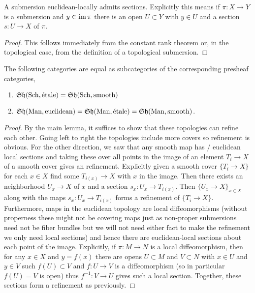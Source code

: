 \documentclass[12pt]{article}
\begin{document}
\begin{lemma}
A submersion euclidean-locally admits sections. Explicitly this means if $\pi : X \to Y$ is a submersion and $y \in \operatorname{\mathrm{im}}{\pi}$ there is an open $U \subset Y$ with $y \in U$ and a section $s : U \to X$ of $\pi$. 
\end{lemma}

\begin{proof}
This follows immediately from the constant rank theorem or, in the topological case, from the definition of a topological submersion.
\end{proof}

\begin{theorem}
The following categories are equal as subcategories of the corresponding presheaf categories,
\begin{enumerate}
\item $\mathfrak{Sh}(\mathrm{Sch}, \text{\'{e}tale}) = \mathfrak{Sh}(\mathrm{Sch}, \mathrm{smooth})$
\item $\mathfrak{Sh}(\mathrm{Man}, \text{euclidean}) = \mathfrak{Sh}(\mathrm{Man}, \text{\'{e}tale}) = \mathfrak{Sh}(\mathrm{Man}, \mathrm{smooth})$.
\end{enumerate}
\end{theorem}

\begin{proof}
By the main lemma, it suffices to show that these topologies can refine each other. Going left to right the topologies include more covers so refinement is obvious. For the other direction, we saw that any smooth map has \etale / euclidean local sections and taking these over all points in the image of an element $T_i \to X$ of a smooth cover gives an \etale refinement. Explicitly given a smooth cover $\{ T_i \to X \}$ for each $x \in X$ find some $T_{i(x)} \to X$ with $x$ in the image. Then there exists an \etale neighborhood $U_x \to X$ of $x$ and a section $s_x : U_x \to T_{i(x)}$. Then $\{ U_x \to X \}_{x \in X}$ along with the maps $s_x : U_x \to T_{i(x)}$ forms a refinement of $\{T_i \to X \}$. 
\bigskip\\
Furthermore, \etale maps in the euclidean topology are local diffeomorphisms (without properness these might not be covering maps just as non-proper submersions need not be fiber bundles but we will not need either fact to make the refinement we only need local sections) and hence there are euclidean-local sections about each point of the image. Explicitly, if $\pi : M \to N$ is a local diffeomorphism, then for any $x \in X$ and $y = f(x)$ there are opens $U \subset M$ and $V \subset N$ with $x \in U$ and $y \in V$ such $f(U) \subset V$ and $f : U \to V$ is a diffeomorphism (so in particular $f(U) = V$ is open) thus $f^{-1} : V \to U$ gives such a local section. Together, these sections form a refinement as previously. 
\end{proof}
\end{document}
